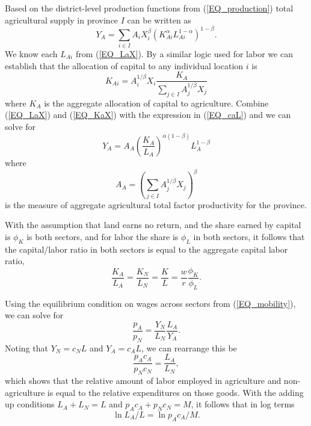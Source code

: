 \documentclass[11pt]{article}
\begin{document}
Based on the district-level production functions from (\ref{EQ_production}) total agricultural supply in province $I$ can be written as
\begin{equation}
Y_A = \sum_{i \in I} A_{i} X_{i}^{\beta} \left(K_{Ai}^{\alpha}L_{Ai}^{1-\alpha}\right)^{1-\beta}. \label{EQ_caL}
\end{equation}
We know each $L_{Ai}$ from (\ref{EQ_LaX}). By a similar logic used for labor we can establish that the allocation of capital to any individual location $i$ is
\begin{equation}
	K_{Ai} = A_{i}^{1/\beta} X_i \frac{K_A}{\sum_{j\in I} A_{j}^{1/\beta}X_{j}} \label{EQ_KaX}
\end{equation}
where $K_A$ is the aggregate allocation of capital to agriculture. Combine (\ref{EQ_LaX}) and (\ref{EQ_KaX}) with the expression in (\ref{EQ_caL}) and we can solve for 
\begin{equation}
	Y_A = A_A \left(\frac{K_A}{L_A}\right)^{\alpha(1-\beta)} L_A^{1-\beta} \nonumber
\end{equation}
where 
\begin{equation}
    A_A = \left(\sum_{j\in I} A_{j}^{1/\beta}X_{j} \right)^\beta \nonumber
\end{equation}
is the measure of aggregate agricultural total factor productivity for the province. 

With the assumption that land earns no return, and the share earned by capital is $\phi_K$ is both sectors, and for labor the share is $\phi_L$ in both sectors, it follows that the capital/labor ratio in both sectors is equal to the aggregate capital labor ratio,
\begin{equation}
    \frac{K_A}{L_A} = \frac{K_N}{L_N} = \frac{K}{L} = \frac{w}{r}\frac{\phi_K}{\phi_L}. \nonumber
\end{equation}

Using the equilibrium condition on wages across sectors from (\ref{EQ_mobility}), we can solve for 
\begin{equation}
    \frac{p_A}{p_N} = \frac{Y_N}{L_N}\frac{L_A}{Y_A}.\label{EQ_papn}
\end{equation}
Noting that $Y_N = c_N L$ and $Y_A = c_A L$, we can rearrange this be
\begin{equation}
    \frac{p_A c_A}{p_N c_N} = \frac{L_A}{L_N}, \label{EQ_expend}
\end{equation}
which shows that the relative amount of labor employed in agriculture and non-agriculture is equal to the relative expenditures on those goods. With the adding up conditions $L_A + L_N = L$ and $p_Ac_A + p_N c_N = M$, it follows that in log terms
\begin{equation}
    \ln L_A/L = \ln p_A c_A/M. \label{EQ_pacaM}
\end{equation}
\end{document}
